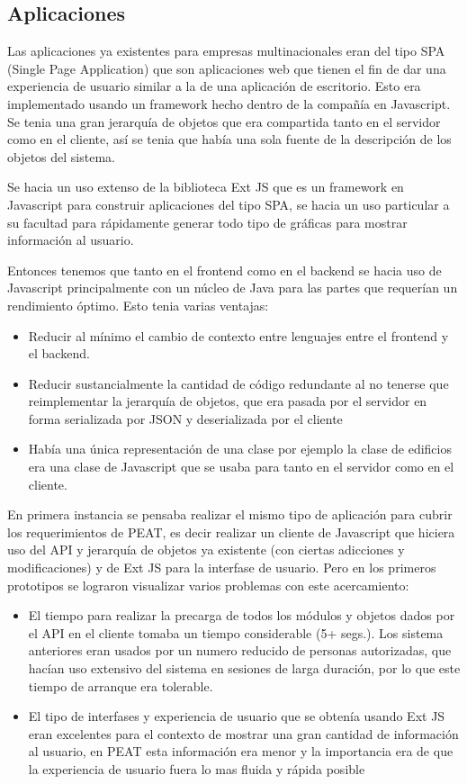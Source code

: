 \documentclass{article}
\begin{document}
\subsection{Aplicaciones}
Las aplicaciones ya existentes para empresas multinacionales eran del tipo
SPA (Single Page Application) que son aplicaciones web que tienen el fin
de dar una experiencia de usuario similar a la de una aplicación de escritorio.
Esto era implementado usando un framework hecho dentro de la compañía
en Javascript. Se tenia una gran jerarquía de objetos que era
compartida tanto en el servidor como en el cliente, así se tenia que
había una sola fuente de la descripción de los objetos del sistema.

Se hacia un uso extenso de la biblioteca Ext JS que es un framework
en Javascript para construir aplicaciones del tipo SPA, se hacia un uso particular
a su facultad para rápidamente generar todo tipo de gráficas para mostrar
información al usuario.

Entonces tenemos que tanto en el frontend como en el backend se hacia
uso de Javascript principalmente con un núcleo de Java para las partes
que requerían un rendimiento óptimo. Esto tenia varias ventajas:

\begin{itemize}
\item Reducir al mínimo el cambio de contexto entre lenguajes entre
  el frontend y el backend.
\item Reducir sustancialmente la cantidad de código redundante al no
  tenerse que reimplementar la jerarquía de objetos, que era pasada
  por el servidor en forma serializada por JSON y deserializada por el
  cliente
\item Había una única representación de una clase por ejemplo la
  clase de edificios era una clase de Javascript que se usaba para
  tanto en el servidor como en el cliente.
\end{itemize}

En primera instancia se pensaba realizar el mismo tipo de aplicación
para cubrir los requerimientos de PEAT, es decir realizar un cliente
de Javascript que hiciera uso del API y jerarquía de objetos ya
existente (con ciertas adicciones y modificaciones) y de Ext JS
para la interfase de usuario. Pero en los primeros prototipos se
lograron visualizar varios problemas con este acercamiento:

\begin{itemize}
\item El tiempo para realizar la precarga de todos los módulos y
  objetos dados por el API en el cliente tomaba un tiempo
  considerable (5+ segs.). Los sistema anteriores eran usados
  por un numero reducido de personas autorizadas, que hacían uso
  extensivo del sistema en sesiones de larga duración, por lo
  que este tiempo de arranque era tolerable.
\item El tipo de interfases y experiencia de usuario que se obtenía
  usando Ext JS eran excelentes para el contexto de mostrar una gran
  cantidad de información al usuario, en PEAT esta información era menor
  y la importancia era de que la experiencia de usuario fuera lo mas fluida y
  rápida posible
\end{itemize}
\end{document}
